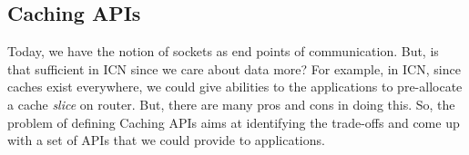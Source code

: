 \subsection{Caching APIs}
\label{apis}
Today, we have the notion of sockets as end points of communication.
But, is that sufficient in ICN since we care about data more? For
example, in ICN, since caches exist everywhere, we could give
abilities to the applications to pre-allocate a cache \emph{slice} on
router. But, there are many pros and cons in doing this. So, the
problem of defining Caching APIs aims at identifying the trade-offs
and come up with a set of APIs that we could provide to applications.

